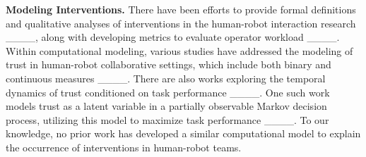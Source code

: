     \noindent\textbf{Modeling Interventions.} There have been efforts to provide formal definitions and qualitative analyses of interventions in the human-robot interaction research ____, along with developing metrics to evaluate operator workload ____. Within computational modeling, various studies have addressed the modeling of trust in human-robot collaborative settings, which include both binary and continuous measures ____. There are also works exploring the temporal dynamics of trust conditioned on task performance ____. One such work models trust as a latent variable in a partially observable Markov decision process, utilizing this model to maximize task performance ____. To our knowledge, no prior work has developed a similar computational model to explain the occurrence of interventions in human-robot teams.